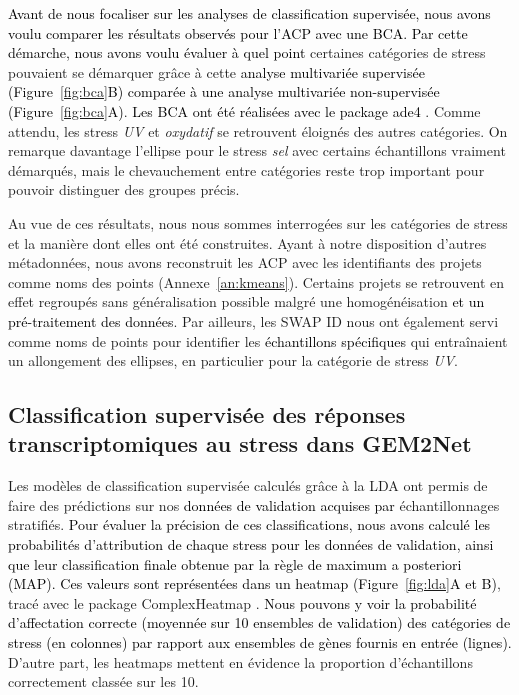 \documentclass[twoside]{article}
\newcommand{\AR}[1]{\textcolor{black}{#1}}
\begin{document}
\vspace{0.5cm}\AR{Avant de nous focaliser sur les analyses de classification supervisée, nous avons voulu comparer les résultats observés pour l'ACP avec une BCA. Par cette démarche, nous avons voulu évaluer à quel point} certaines catégories de stress pouvaient se démarquer grâce à cette \AR{analyse multivariée supervisée (Figure~\ref{fig:bca}B) comparée à une analyse multivariée non-supervisée (Figure~\ref{fig:bca}A)}. \AR{Les BCA ont été réalisées avec le package ade4 \cite{dray_ade4_2007}}.
Comme attendu, les stress \textit{UV} et \textit{oxydatif} se retrouvent éloignés des autres catégories. On remarque davantage l'ellipse pour le stress \textit{sel} avec certains échantillons vraiment démarqués, mais le chevauchement entre catégories reste trop important pour pouvoir distinguer des groupes précis. 

\vspace{0.5cm}Au vue de ces résultats, nous nous sommes interrogées sur les catégories de stress et la manière dont elles ont été construites. Ayant à notre disposition d'autres métadonnées, nous avons reconstruit les ACP avec les identifiants des projets comme noms des points (Annexe~\ref{an:kmeans}). Certains projets se retrouvent en effet regroupés sans généralisation possible malgré une homogénéisation \AR{et un pré-traitement des données}. Par ailleurs, les SWAP ID nous ont également servi comme noms de points pour identifier les \AR{échantillons spécifiques} qui entraînaient un allongement des ellipses, en particulier pour la catégorie de stress \textit{UV}.

\newpage
    \subsection{Classification supervisée des réponses transcriptomiques au stress dans GEM2Net}

\vspace{0.5cm}Les modèles de classification supervisée calculés grâce à la LDA ont permis de faire des prédictions sur nos \AR{données de validation acquises par} échantillonnages stratifiés. \AR{Pour évaluer la précision de ces classifications, nous avons calculé les probabilités d'attribution de chaque stress pour les données de validation, ainsi que leur classification finale obtenue par la règle de maximum a posteriori (MAP). Ces valeurs sont représentées dans un heatmap (Figure~\ref{fig:lda}A et B)}, tracé avec le package ComplexHeatmap \cite{gu_complex_2016}. \AR{Nous pouvons y voir la probabilité d'affectation correcte (moyennée sur 10 ensembles de validation) des catégories de stress (en colonnes) par rapport aux ensembles de gènes fournis en entrée (lignes).}  D'autre part, les heatmaps mettent en évidence la proportion d'échantillons correctement classée sur les 10. 
\end{document}
